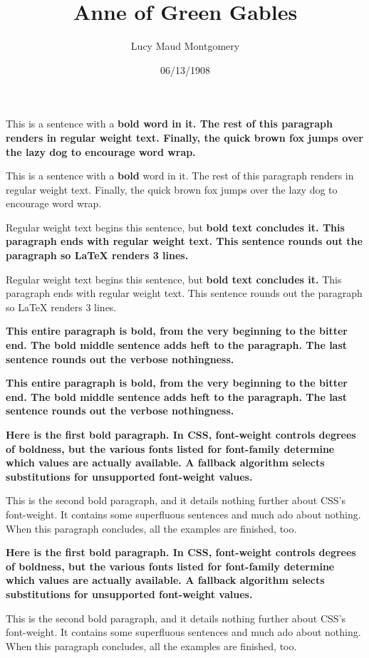 \documentclass[a4paper]{article}
\title{Anne of Green Gables}
\author{Lucy Maud Montgomery}
\date{06/13/1908}
\begin{document}
\maketitle

This is a sentence with a \bfseries bold \mdseries word in it. The rest of this paragraph renders in regular weight text. Finally, the quick brown fox jumps over the lazy dog to encourage word wrap.

This is a sentence with a {\bfseries bold} word in it. The rest of this paragraph renders in regular weight text. Finally, the quick brown fox jumps over the lazy dog to encourage word wrap.

Regular weight text begins this sentence, but \bfseries bold text concludes it. \mdseries This paragraph ends with regular weight text. This sentence rounds out the paragraph so LaTeX renders 3 lines.

Regular weight text begins this sentence, but {\bfseries bold text concludes it.} This paragraph ends with regular weight text. This sentence rounds out the paragraph so LaTeX renders 3 lines.

\bfseries This entire paragraph is bold, from the very beginning to the bitter end. The bold middle sentence adds heft to the paragraph. The last sentence rounds out the verbose nothingness. \mdseries

{\bfseries This entire paragraph is bold, from the very beginning to the bitter end. The bold middle sentence adds heft to the paragraph. The last sentence rounds out the verbose nothingness.}

\bfseries Here is the first bold paragraph. In CSS, font-weight controls degrees of boldness, but the various fonts listed for font-family determine which values are actually available. A fallback algorithm selects substitutions for unsupported font-weight values.

This is the second bold paragraph, and it details nothing further about CSS's font-weight. It contains some superfluous sentences and much ado about nothing. When this paragraph concludes, all the examples are finished, too. \mdseries

{\bfseries Here is the first bold paragraph. In CSS, font-weight controls degrees of boldness, but the various fonts listed for font-family determine which values are actually available. A fallback algorithm selects substitutions for unsupported font-weight values.

This is the second bold paragraph, and it details nothing further about CSS's font-weight. It contains some superfluous sentences and much ado about nothing. When this paragraph concludes, all the examples are finished, too.}
\end{document}
